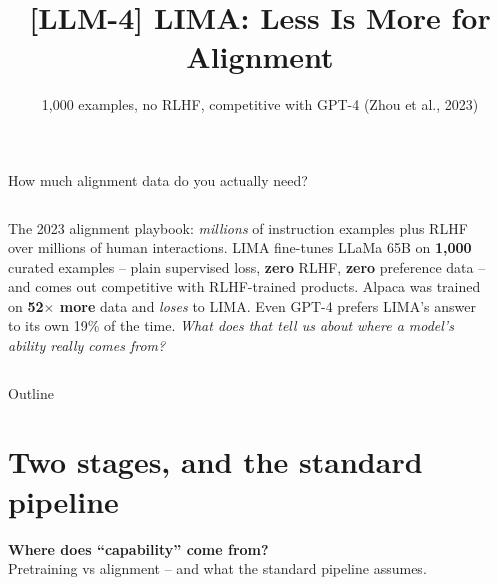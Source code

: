 \documentclass[aspectratio=169]{beamer}
\title{[LLM-4] LIMA: Less Is More for Alignment}
\subtitle{1,000 examples, no RLHF, competitive with GPT-4 (Zhou et al., 2023)}
\date{}
\begin{document}
\begin{frame}{How much alignment data do you actually need?}
  \begin{columns}[T]
    The 2023 alignment playbook: \emph{millions} of instruction examples plus RLHF over
    millions of human interactions.
    \vskip 8pt
    LIMA fine-tunes LLaMa 65B on \textbf{1,000} curated examples -- plain supervised loss,
    \textbf{zero} RLHF, \textbf{zero} preference data -- and comes out competitive with
    RLHF-trained products.
    \vskip 8pt
    Alpaca was trained on \textbf{52$\times$ more} data and \emph{loses} to LIMA. Even GPT-4
    prefers LIMA's answer to its own 19\% of the time.
    \vskip 8pt
    \emph{What does that tell us about where a model's ability really comes from?}
    \begin{center}
    \end{center}
  \end{columns}
\end{frame}

\begin{frame}{Outline}
  \tableofcontents
\end{frame}

\section{Two stages, and the standard pipeline}

\begin{frame}[plain]
  \vfill
  \begin{center}
    {\color{popblue}\Large\bfseries Where does ``capability'' come from?}\\[4pt]
    \small Pretraining vs alignment -- and what the standard pipeline assumes.
  \end{center}
  \vfill
\end{frame}
\end{document}

